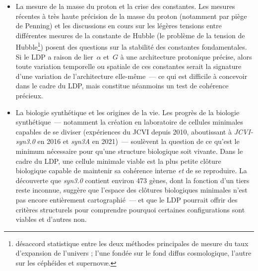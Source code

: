 \documentclass[12pt, a4paper, openright]{book}
\begin{document}
\begin{itemize}
\item La mesure de la masse du proton et la crise des constantes. Les mesures récentes à très haute précision de la masse du proton (notamment par piège de Penning) et les discussions en cours sur les légères tensions entre différentes mesures de la constante de Hubble (le \og problème de la tension de Hubble\footnote{désaccord statistique entre les deux méthodes principales de mesure du taux d'expansion de l'univers ; l'une fondée sur le fond diffus cosmologique, l'autre sur les céphéides et supernovæ.}\fg{}) posent des questions sur la stabilité des constantes fondamentales. Si le LDP a raison de lier~$\alpha$ et~$G$ à une architecture protonique précise, alors toute variation temporelle ou spatiale de ces constantes serait la signature d'une variation de l'architecture elle-même~--- ce qui est difficile à concevoir dans le cadre du LDP, mais constitue néanmoins un test de cohérence précieux.

\item La biologie synthétique et les origines de la vie. Les progrès de la biologie synthétique~--- notamment la création en laboratoire de cellules minimales capables de se diviser (expériences du JCVI depuis 2010, aboutissant à \textit{JCVI-syn3.0} en 2016 et \textit{syn3A} en 2021)~--- soulèvent la question de ce qu'est le minimum nécessaire pour qu'une structure biologique soit \og vivante\fg{}. Dans le cadre du LDP, une cellule minimale viable est la plus petite clôture biologique capable de maintenir sa cohérence interne \emph{et} de se reproduire. La découverte que \textit{syn3.0} contient environ 473 gènes, dont la fonction d'un tiers reste inconnue, suggère que l'espace des clôtures biologiques minimales n'est pas encore entièrement cartographié~--- et que le LDP pourrait offrir des critères structurels pour comprendre pourquoi certaines configurations sont viables et d'autres non.


\end{itemize}
\end{document}
